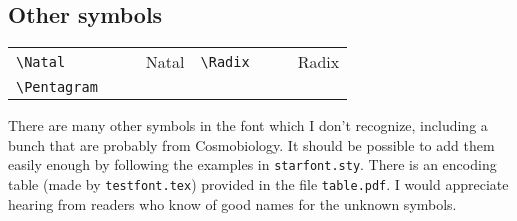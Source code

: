\documentclass{article}
\newcommand{\showboth}[1]{\starfontsans #1 & \starfontserif #1}
\begin{document}
\subsection{Other symbols}

\begin{tabular}{llll|llll}
\verb|\Natal| & \showboth{\Natal} & Natal &
   \verb|\Radix| & \showboth{\Radix} & Radix \\
\verb|\Pentagram| & \showboth{\Pentagram}
\end{tabular}

There are many other symbols in the font which I don't recognize,
including a bunch that are probably from Cosmobiology.  It should be
possible to add them easily enough by following the examples in
\texttt{starfont.sty}. There is an encoding table (made by
\texttt{testfont.tex}) provided in the file \texttt{table.pdf}.  I
would appreciate hearing from readers who know of good names for the
unknown symbols.
\end{document}
